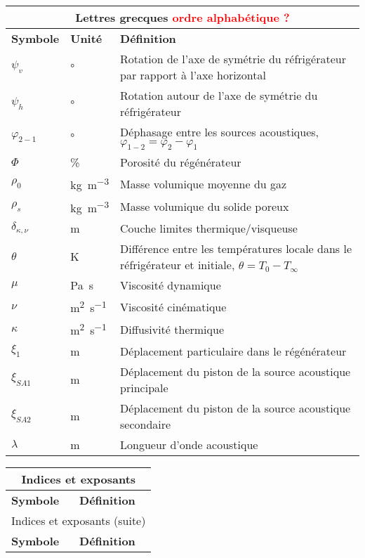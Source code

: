 \begin{center}
    \begin{longtable}{p{} p{} p{}}
        \multicolumn{3}{c}{Lettres grecques \textcolor{red}{ordre alphabétique ?}}  \\\hline
        \textbf{Symbole} & \textbf{Unité} & \textbf{Définition} \\\hline\hline
        $\psi_v$ & \unit{\degree} & Rotation de l'axe de symétrie du réfrigérateur par rapport à l'axe horizontal\\
        $\psi_h$ & \unit{\degree} & Rotation autour de l'axe de symétrie du réfrigérateur \\
        $\varphi_{2-1}$ & \unit{\degree} & Déphasage entre les sources acoustiques, $\varphi_{1-2} = \varphi_2 - \varphi_1$\\
        $\Phi$ & \unit{\percent} & Porosité du régénérateur \\
        $\rho_0$ & \unit{\kilo\gram\per\cubic\meter} & Masse volumique moyenne du gaz \\
        $\rho_{s}$ & \unit{\kilo\gram\per\cubic\meter} & Masse volumique du solide poreux\\
        $\delta_{\kappa,\nu}$ & \unit{\meter} & Couche limites thermique/visqueuse \\
        $\theta$ & \unit{\kelvin} & Différence entre les températures locale dans le réfrigérateur et initiale, $\theta=T_0-T_\infty$\\
        $\mu$ & \unit{\pascal\second} & Viscosité dynamique \\
        $\nu$ & \unit{\square\meter\per\second} & Viscosité cinématique \\
        $\kappa$ & \unit{\square\meter\per\second} & Diffusivité thermique \\
        $\xi_1$ & \unit{\meter} & Déplacement particulaire dans le régénérateur \\
        $\xi_{SA1}$ & \unit{\meter} & Déplacement du piston de la source acoustique principale \\
        $\xi_{SA2}$ & \unit{\meter} & Déplacement du piston de la source acoustique secondaire \\
        $\lambda$ & \unit{\meter} & Longueur d'onde acoustique \\\hline
    \end{longtable}

\bigskip

    \begin{longtable}{p{} p{}}
        \multicolumn{2}{c}{Indices et exposants}  \\\hline
        \textbf{Symbole} & \textbf{Définition} \\\hline\hline \endfirsthead
        \multicolumn{2}{c}{Indices et exposants (suite)}  \\\hline
        \textbf{Symbole} & \textbf{Définition} \\\hline\hline \endhead
		

\end{longtable}
\end{center}
